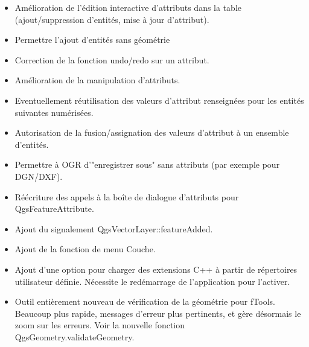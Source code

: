 \begin{itemize}[label=--]
\item Amélioration de l'édition interactive d'attributs dans la table 
(ajout/suppression d'entités, mise à jour d'attribut). 
\item Permettre l'ajout d'entités sans géométrie 
\item Correction de la fonction undo/redo sur un attribut. 
\item Amélioration de la manipulation d'attributs. 
\item Eventuellement réutilisation des valeurs d'attribut renseignées pour les 
entités suivantes numérisées. 
\item Autorisation de la fusion/assignation des valeurs d'attribut à un ensemble 
d'entités. 
\item Permettre à OGR d'"enregistrer sous" sans attributs (par exemple pour DGN/DXF). 
\end{itemize}


\begin{itemize}[label=--]
\item  Réécriture des appels à la boîte de dialogue d'attributs pour QgsFeatureAttribute. 
\item Ajout du signalement QgsVectorLayer::featureAdded. 
\item Ajout de la fonction de menu Couche. 
\item Ajout d'une option pour charger des extensions C++ à partir de répertoires 
utilisateur définie. Nécessite le redémarrage de l'application pour l'activer. 
\item Outil entièrement nouveau de vérification de la géométrie pour fTools. 
Beaucoup plus rapide, messages d'erreur plus pertinents, et gère désormais le 
zoom sur les erreurs. Voir la nouvelle fonction QgsGeometry.validateGeometry.
\end{itemize}

